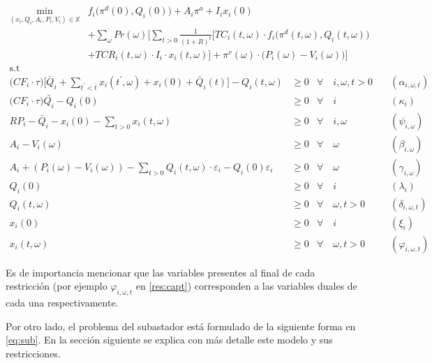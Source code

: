\begin{align}
\min_{(x_i,Q_i,A_i,P_i,V_i)\in \mathbb{X}} &  f_i \big( \pi^d(0),Q_i(0)\big)+ A_i \pi^{a} + I_i x_i(0) \nonumber \\ 
& + \sum_{\omega} Pr(\omega)   \Bigg[ \sum_{t>0} \frac{1}{(1+R)^t} \Big[ TC_i(t,\omega)\cdot f_i \big( \pi^d(t,\omega),Q_i(t,\omega) \big)  \nonumber \\
 & + TCR_i(t,\omega) \cdot I_i\cdot x_i(t,\omega) \Big] + \pi^v(\omega)\cdot \big(P_i(\omega)-V_i(\omega)\big) \Bigg]  \label{fo:prod}\\
     \textrm{s.t \ } \nonumber
\end{align}
\begin{align}
    \Big(CF_i \cdot\tau\Big)  \Bigg[\bar{Q}_i + \sum_{t^{\prime}<\bar{t}} x_i(t^\prime,\omega) + x_i(0)+ \bar{Q}_i(t) \Bigg] - Q_i(t,\omega) & \geq 0  & \forall  \quad i,\omega, t  > 0 & \quad (\alpha_{i,\omega,t})\label{res:1}\\
    \Big(CF_i\cdot\tau \Big)\bar{Q_i}-Q_{i}(0) & \geq 0  & \forall  \quad i & \quad (\kappa_i) \label{res:2}\\
     RP_i - \bar{Q}_i  - x_i(0) - \sum_{t > 0} x_i(t,\omega) & \geq 0 &  \forall \quad i,\omega &   \quad (\psi_{i,\omega}) \label{res:3}\\
 A_{i} -V_i(\omega) & \geq  0  & \forall  \quad \omega & \quad (\beta_{i,\omega}) \label{res:4}\\
 A_{i} + (P_i(\omega) - V_i(\omega))-\sum_{t>0}Q_i(t, \omega)\cdot \varepsilon_{i}-Q_i(0)\varepsilon_{i} & \geq  0  &\forall \quad \omega & \quad (\gamma_{i,\omega})\label{res:5}\\
 Q_i(0) & \geq  0 & \forall \quad i & \quad (\lambda_i) \label{res:q0}\\ 
 Q_i(t, \omega) & \geq  0   & \forall \quad \omega, t >0 & \quad (\delta_{i,\omega,t})\label{res:qt}\\
  x_i(0) & \geq  0 & \forall  \quad i & \quad (\xi_i)  \label{res:capi0}\\ 
  x_i(t, \omega) & \geq  0   & \forall  \quad \omega, t >0 & \quad (\varphi_{i,\omega,t})\label{res:capt}
  \end{align}

Es de importancia mencionar que las variables presentes al final de cada restricción (por ejemplo $\varphi_{i,\omega,t}$ en \ref{res:capt}) corresponden a las variables duales de cada una respectivamente.
\vspace{2.5mm}

Por otro lado, el problema del subastador está formulado de la siguiente forma en \ref{eq:sub}. En la sección siguiente se explica con más detalle este modelo y sus restricciones.


